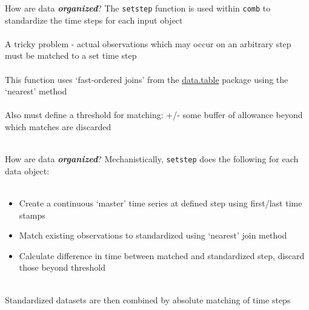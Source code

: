 \documentclass[serif]{beamer}\usepackage[]{graphicx}\usepackage[]{color}
\newcommand{\Bigtxt}[1]{\textbf{\textit{#1}}}
\begin{document}
\begin{frame}{How are data \Bigtxt{organized}?}
The \texttt{setstep} function is used within \texttt{comb} to standardize the time steps for each input object \\~\\
A tricky problem - actual observations which may occur on an arbitrary step must be matched to a set time step\\~\\
This function uses `fast-ordered joins' from the \href{http://cran.r-project.org/web/packages/data.table/index.html}{data.table} package using the `nearest' method\\~\\
Also must define a threshold for matching: +/- some buffer of allowance beyond which matches are discarded \\~\\
\end{frame}

\begin{frame}{How are data \Bigtxt{organized}?}
Mechanistically, \texttt{setstep} does the following for each data object: \\~\\
\begin{itemize}
\item Create a continuous `master' time series at defined step using first/last time stamps
\item Match existing observations to standardized using `nearest' join method
\item Calculate difference in time between matched and standardized step, discard those beyond threshold \\~\\
\end{itemize}
Standardized datasets are then combined by absolute matching of time steps
\end{frame}
\end{document}
